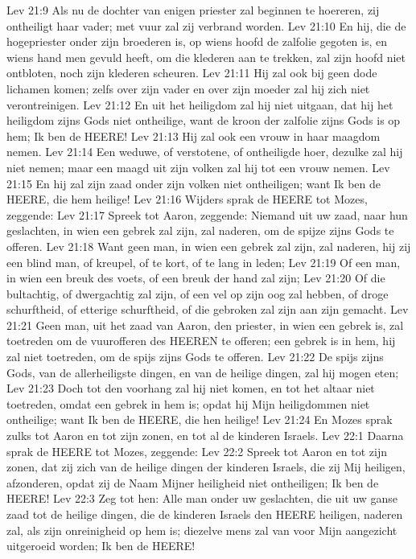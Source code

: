 Lev 21:9  Als nu de dochter van enigen priester zal beginnen te hoereren, zij ontheiligt haar vader; met vuur zal zij verbrand worden.
Lev 21:10  En hij, die de hogepriester onder zijn broederen is, op wiens hoofd de zalfolie gegoten is, en wiens hand men gevuld heeft, om die klederen aan te trekken, zal zijn hoofd niet ontbloten, noch zijn klederen scheuren.
Lev 21:11  Hij zal ook bij geen dode lichamen komen; zelfs over zijn vader en over zijn moeder zal hij zich niet verontreinigen.
Lev 21:12  En uit het heiligdom zal hij niet uitgaan, dat hij het heiligdom zijns Gods niet ontheilige, want de kroon der zalfolie zijns Gods is op hem; Ik ben de HEERE!
Lev 21:13  Hij zal ook een vrouw in haar maagdom nemen.
Lev 21:14  Een weduwe, of verstotene, of ontheiligde hoer, dezulke zal hij niet nemen; maar een maagd uit zijn volken zal hij tot een vrouw nemen.
Lev 21:15  En hij zal zijn zaad onder zijn volken niet ontheiligen; want Ik ben de HEERE, die hem heilige!
Lev 21:16  Wijders sprak de HEERE tot Mozes, zeggende:
Lev 21:17  Spreek tot Aaron, zeggende: Niemand uit uw zaad, naar hun geslachten, in wien een gebrek zal zijn, zal naderen, om de spijze zijns Gods te offeren.
Lev 21:18  Want geen man, in wien een gebrek zal zijn, zal naderen, hij zij een blind man, of kreupel, of te kort, of te lang in leden;
Lev 21:19  Of een man, in wien een breuk des voets, of een breuk der hand zal zijn;
Lev 21:20  Of die bultachtig, of dwergachtig zal zijn, of een vel op zijn oog zal hebben, of droge schurftheid, of etterige schurftheid, of die gebroken zal zijn aan zijn gemacht.
Lev 21:21  Geen man, uit het zaad van Aaron, den priester, in wien een gebrek is, zal toetreden om de vuurofferen des HEEREN te offeren; een gebrek is in hem, hij zal niet toetreden, om de spijs zijns Gods te offeren.
Lev 21:22  De spijs zijns Gods, van de allerheiligste dingen, en van de heilige dingen, zal hij mogen eten;
Lev 21:23  Doch tot den voorhang zal hij niet komen, en tot het altaar niet toetreden, omdat een gebrek in hem is; opdat hij Mijn heiligdommen niet ontheilige; want Ik ben de HEERE, die hen heilige!
Lev 21:24  En Mozes sprak zulks tot Aaron en tot zijn zonen, en tot al de kinderen Israels.
Lev 22:1  Daarna sprak de HEERE tot Mozes, zeggende:
Lev 22:2  Spreek tot Aaron en tot zijn zonen, dat zij zich van de heilige dingen der kinderen Israels, die zij Mij heiligen, afzonderen, opdat zij de Naam Mijner heiligheid niet ontheiligen; Ik ben de HEERE!
Lev 22:3  Zeg tot hen: Alle man onder uw geslachten, die uit uw ganse zaad tot de heilige dingen, die de kinderen Israels den HEERE heiligen, naderen zal, als zijn onreinigheid op hem is; diezelve mens zal van voor Mijn aangezicht uitgeroeid worden; Ik ben de HEERE!
